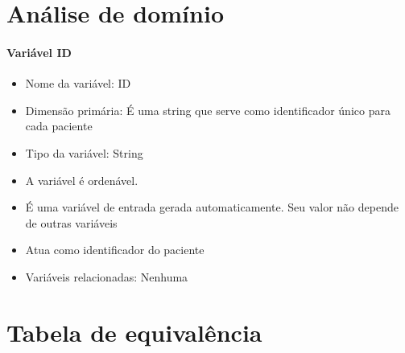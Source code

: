 \section*{Análise de domínio}

\paragraph{Variável ID}
\begin{itemize}
\item Nome da variável: ID
\item Dimensão primária: É uma string que serve como identificador único para
    cada paciente
\item Tipo da variável: String
\item A variável é ordenável.
\item É uma variável de entrada gerada automaticamente. Seu valor não depende
    de outras variáveis
\item Atua como identificador do paciente
\item Variáveis relacionadas: Nenhuma
\end{itemize}
\section*{Tabela de equivalência}

